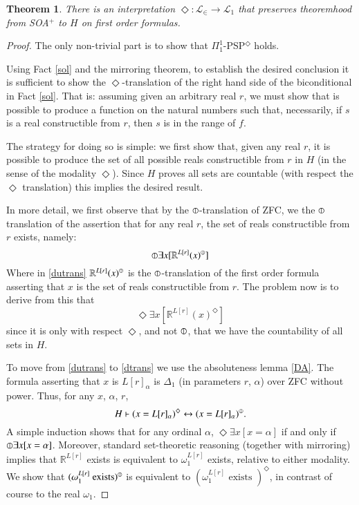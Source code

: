 \documentclass{article}
\newcommand\D{\circledbar}
\newtheorem{theorem}{Theorem}
\begin{document}
\begin{theorem}
    There is an interpretation $\Diamond: \mathcal{L}_\in \to \mathcal{L}_1$ that preserves theoremhood from SOA$^+$ to $H$
    \emph{on first order formulas}. 
\end{theorem}
\begin{proof}
    The only non-trivial part is to show that $\Pi_1^1$-PSP$^\Diamond$ holds.

    Using Fact \ref{sol} and the mirroring theorem, to establish 
the desired conclusion it is sufficient to show the $\Diamond$-translation 
of the right hand side of the biconditional in Fact \ref{sol}. That is: assuming given an arbitrary real $r$, 
we must show that is possible to produce a function on the natural numbers such that, 
necessarily, if $s$ is a real constructible from $r$, 
then $s$ is in the range of $f$.

The strategy for doing so is simple: we first show that, given any real $r$, 
it is possible to produce the set of all possible reals constructible from $r$ in 
$H$ (in the sense of the modality $\Diamond$). Since $H$ proves all sets are countable (with respect the $\Diamond$ translation)
this implies the desired result.

In more detail,
we first observe that by the $\D$-translation of ZFC, 
we the $\D$ translation of the assertion that for any real $r$, the 
set of reals constructible from $r$ exists, namely:
\begin{equation}\label{dutrans}
    \D \exists x [\mathbb{R}^{L[r]}(x)^{\D}]
\end{equation}
Where in \eqref{dutrans} $\mathbb{R}^{L[r]}(x)^{\D}$ is the $\D$-translation of the first order 
formula asserting that $x$ 
is the set of reals constructible from $r$. The problem now is to derive from this 
that 
\begin{equation}\label{dtrans}
    \Diamond \exists x [\mathbb{R}^{L[r]}(x)^{\Diamond}]
\end{equation}
since it is only with respect $\Diamond$, and not $\D$, that we have the countability 
of all sets in $H$.

To move from \eqref{dutrans} to \eqref{dtrans} we use the absoluteness 
lemma \ref{DA}. The formula asserting that $x$ is $L[r]_\alpha$ is $\Delta_1$ 
(in parameters $r$, $\alpha$) 
over ZFC without power. Thus, for any $x$, $\alpha$, $r$, 
\begin{equation}\label{butt}H \vdash (x = L[r]_\alpha)^\Diamond \leftrightarrow
(x = L[r]_\alpha)^{\D}.\end{equation}
A simple induction shows that for any ordinal $\alpha$, $\Diamond \exists x[ x = \alpha]$ if and only if 
$\D \exists x[x = \alpha]$.
Moreover, standard set-theoretic reasoning (together with mirroring) 
implies that $\mathbb{R}^{L[r]}$ exists is equivalent to $\omega_1^{L[r]}$
exists, relative to either modality. 
We show that $(\omega_1^{L[r]} \text{ exists})^{\D}$ is equivalent to 
$(\omega_1^{L[r]} \text{ exists })^\Diamond$, 
in contrast of course to the real $\omega_1$.


\end{proof}
\end{document}
